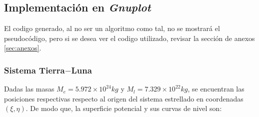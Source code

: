 \subsection{Implementación en \textit{Gnuplot}}

El codigo generado, al no ser un algoritmo como tal, no se mostrará el pseudocódigo, pero si se desea ver el codigo utilizado, revisar la sección de anexos \ref{sec:anexos}.

\subsubsection{Sistema Tierra$-$Luna}
Dadas las masas $M_{e} = 5.972\times 10^{24} kg$ y $M_l = 7.329\times 10^{22} kg$, se encuentran las posiciones respectivas respecto al origen del sistema estrellado en coordenadas $(\xi ,\eta)$. De modo que, la superficie potencial y sus curvas de nivel son:

